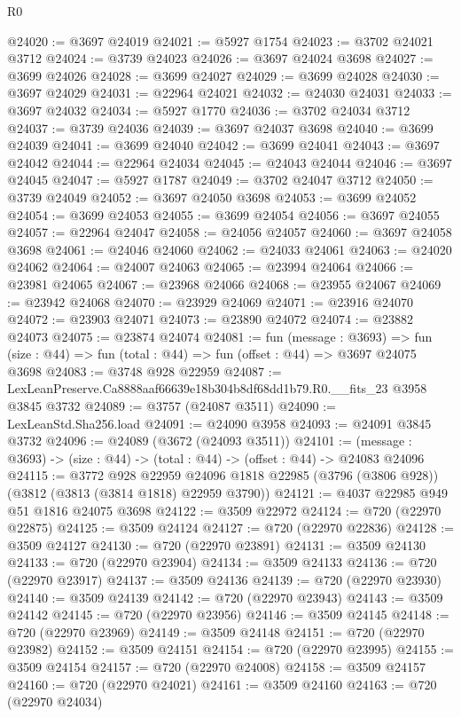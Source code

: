 \begin{lexlean}{R0}
\begin{coremodule}
@24020 := @3697 @24019
@24021 := @5927 @1754
@24023 := @3702 @24021 @3712
@24024 := @3739 @24023
@24026 := @3697 @24024 @3698
@24027 := @3699 @24026
@24028 := @3699 @24027
@24029 := @3699 @24028
@24030 := @3697 @24029
@24031 := @22964 @24021
@24032 := @24030 @24031
@24033 := @3697 @24032
@24034 := @5927 @1770
@24036 := @3702 @24034 @3712
@24037 := @3739 @24036
@24039 := @3697 @24037 @3698
@24040 := @3699 @24039
@24041 := @3699 @24040
@24042 := @3699 @24041
@24043 := @3697 @24042
@24044 := @22964 @24034
@24045 := @24043 @24044
@24046 := @3697 @24045
@24047 := @5927 @1787
@24049 := @3702 @24047 @3712
@24050 := @3739 @24049
@24052 := @3697 @24050 @3698
@24053 := @3699 @24052
@24054 := @3699 @24053
@24055 := @3699 @24054
@24056 := @3697 @24055
@24057 := @22964 @24047
@24058 := @24056 @24057
@24060 := @3697 @24058 @3698
@24061 := @24046 @24060
@24062 := @24033 @24061
@24063 := @24020 @24062
@24064 := @24007 @24063
@24065 := @23994 @24064
@24066 := @23981 @24065
@24067 := @23968 @24066
@24068 := @23955 @24067
@24069 := @23942 @24068
@24070 := @23929 @24069
@24071 := @23916 @24070
@24072 := @23903 @24071
@24073 := @23890 @24072
@24074 := @23882 @24073
@24075 := @23874 @24074
@24081 := fun (message : @3693) =>
  fun (size : @44) => fun (total : @44) => fun (offset : @44) => @3697 @24075 @3698
@24083 := @3748 @928 @22959
@24087 := LexLeanPreserve.Ca8888aaf66639e18b304b8df68dd1b79.R0.__fits_23 @3958 @3845 @3732
@24089 := @3757 (@24087 @3511)
@24090 := LexLeanStd.Sha256.load
@24091 := @24090 @3958
@24093 := @24091 @3845 @3732
@24096 := @24089 (@3672 (@24093 @3511))
@24101 := (message : @3693) -> (size : @44) -> (total : @44) -> (offset : @44) -> @24083 @24096
@24115 := @3772
    @928
    @22959
    @24096
    @1818
    @22985
    (@3796 (@3806 @928))
    (@3812 (@3813 (@3814 @1818) @22959 @3790))
@24121 := @4037 @22985 @949 @51 @1816 @24075 @3698
@24122 := @3509 @22972
@24124 := @720 (@22970 @22875)
@24125 := @3509 @24124
@24127 := @720 (@22970 @22836)
@24128 := @3509 @24127
@24130 := @720 (@22970 @23891)
@24131 := @3509 @24130
@24133 := @720 (@22970 @23904)
@24134 := @3509 @24133
@24136 := @720 (@22970 @23917)
@24137 := @3509 @24136
@24139 := @720 (@22970 @23930)
@24140 := @3509 @24139
@24142 := @720 (@22970 @23943)
@24143 := @3509 @24142
@24145 := @720 (@22970 @23956)
@24146 := @3509 @24145
@24148 := @720 (@22970 @23969)
@24149 := @3509 @24148
@24151 := @720 (@22970 @23982)
@24152 := @3509 @24151
@24154 := @720 (@22970 @23995)
@24155 := @3509 @24154
@24157 := @720 (@22970 @24008)
@24158 := @3509 @24157
@24160 := @720 (@22970 @24021)
@24161 := @3509 @24160
@24163 := @720 (@22970 @24034)

\end{coremodule}
\end{lexlean}
